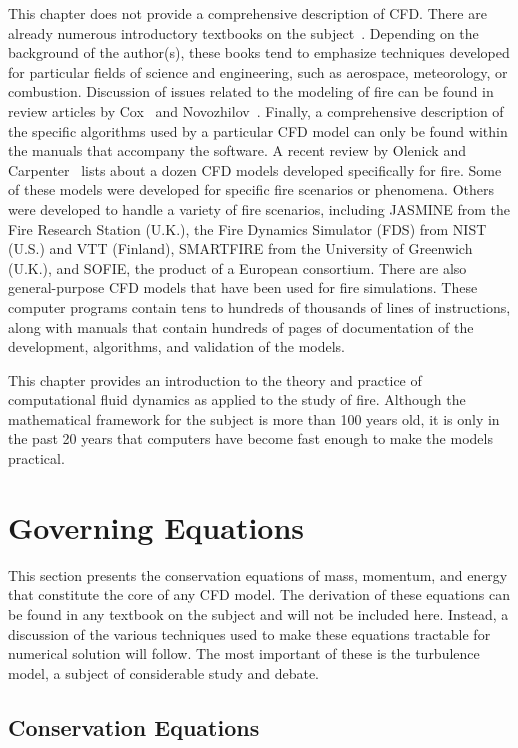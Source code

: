 \documentclass[graybox]{svmult}
\begin{document}
This chapter does not provide a comprehensive description of CFD. There are already numerous introductory textbooks on the subject~\cite{Anderson, Ferziger, Patankar, Peyret, Versteeg}. Depending on the background of the author(s), these books tend to emphasize techniques developed for particular fields of science and engineering, such as aerospace, meteorology, or combustion. Discussion of issues related to the modeling of fire can be found in review articles by Cox~\cite{Cox:1995,Cox:1998}  and Novozhilov~\cite{Novozhilov}. Finally, a comprehensive description of the specific algorithms used by a particular CFD model can only be found within the manuals that accompany the software. A recent review by Olenick and Carpenter~\cite{Olenick} lists about a dozen CFD models developed specifically for fire. Some of these models were developed for specific fire scenarios or phenomena. Others were developed to handle a variety of fire scenarios, including JASMINE from the Fire Research Station (U.K.), the Fire Dynamics Simulator (FDS) from NIST (U.S.) and VTT (Finland), SMARTFIRE from the University of Greenwich (U.K.), and SOFIE, the product of a European consortium. There are also general-purpose CFD models that have been used for fire simulations. These computer programs contain tens to hundreds of thousands of lines of instructions, along with manuals that contain hundreds of pages of documentation of the development, algorithms, and validation of the models.

This chapter provides an introduction to the theory and practice of computational fluid dynamics as applied to the study of fire. Although the mathematical framework for the subject is more than 100 years old, it is only in the past 20 years that computers have become fast enough to make the models practical.


\section{Governing Equations}

This section presents the conservation equations of mass, momentum, and energy that constitute the core of any CFD model. The derivation of these equations can be found in any textbook on the subject and will not be included here. Instead, a discussion of the various techniques used to make these equations tractable for numerical solution will follow. The most important of these is the turbulence model, a subject of considerable study and debate.

\subsection{Conservation Equations}
\end{document}
